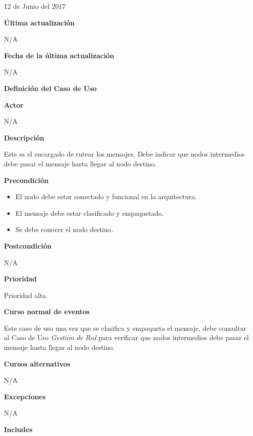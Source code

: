 12 de Junio del 2017

\large\textbf{Última actualización}
\vspace{3mm}

N/A

\large\textbf{Fecha de la última actualización}
\vspace{3mm}

N/A

\Large\textbf{Definición del Caso de Uso}
\vspace{3mm}

\large\textbf{Actor}
\vspace{3mm}

N/A

\large\textbf{Descripción}
\vspace{3mm}

Este es el encargado de rutear los mensajes. Debe indicar que nodos intermedios
debe pasar el mensaje hasta llegar al nodo destino.

\large\textbf{Precondición}
\begin{itemize}
\item El nodo debe estar conectado y funcional en la arquitectura.
\item El mensaje debe estar clasificado y empaquetado.
\item Se debe conocer el nodo destino. 
\end{itemize}

\large\textbf{Postcondición}
\vspace{5mm}

N/A

\large\textbf{Prioridad}
\vspace{3mm}

Prioridad alta.

\large\textbf{Curso normal de eventos}
\vspace{3mm}

Este caso de uso una vez que se clasifica y empaqueta el mensaje,
debe consultar al Caso de Uso \textit{Gestion de Red} para verificar
que nodos intermedios debe pasar el mensaje hasta llegar al nodo
destino. 

\large\textbf{Cursos alternativos}
\vspace{3mm}

N/A

\large\textbf{Excepciones}
\vspace{3mm}

N/A

\large\textbf{Includes}
\vspace{3mm}


